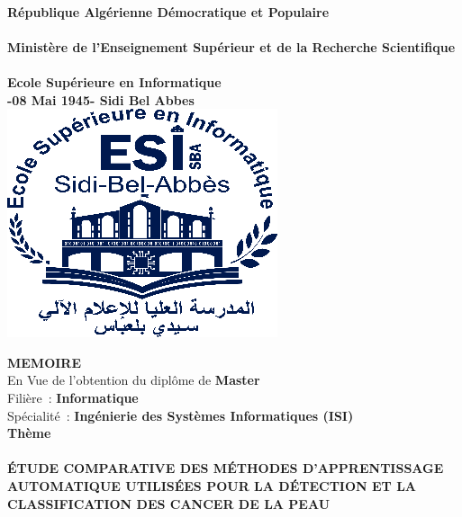 \begin{titlepage}
    \begin{center}	
         \\
        \textbf{République Algérienne Démocratique et Populaire} \\
         \\
        \textbf{Ministère de l’Enseignement Supérieur et de la Recherche Scientifique} \\
         \\
        \textbf{Ecole Supérieure en Informatique} \\
        \textbf{-08 Mai 1945- Sidi Bel Abbes} \\

        \bigskip
        \includegraphics[]{./cover-page/logo.png}
        \bigskip
        
        \textbf{MEMOIRE} \\
        \vspace{0.2cm}
        En Vue de l’obtention du diplôme de \textbf{Master} \\
        \vspace{0.2cm}
        Filière : \textbf{Informatique}\\
        \vspace{0.2cm}
        Spécialité : \textbf{Ingénierie des Systèmes Informatiques (ISI)}\\
        \LARGE
        \textbf{Thème} \\
        \hrulefill \\
        \normalsize
        \textbf{ÉTUDE COMPARATIVE DES MÉTHODES D'APPRENTISSAGE AUTOMATIQUE  UTILISÉES POUR LA DÉTECTION ET LA CLASSIFICATION DES CANCER DE LA PEAU} \\
        \hrulefill \\


\end{center}
\end{titlepage}

